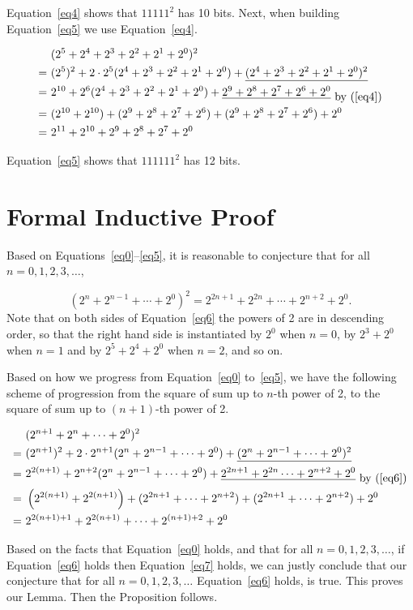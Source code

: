 \documentclass{article}
\begin{document}
Equation~\ref{eq4} shows that $11111^2$ has 10 bits. Next, when building Equation~\ref{eq5} we use Equation~\ref{eq4}.


\begin{eqnarray} \label{eq5}
    & (2^5+2^4+2^3+2^2+2^1+2^0)^2\nonumber\\
   =\ & (2^5)^2+2\cdot2^5(2^4+2^3+2^2+2^1+2^0)+\underline{(2^4+2^3+2^2+2^1+2^0)^2}\nonumber\\
   =\ & 2^{10}+2^6(2^4+2^3+2^2+2^1+2^0)+\underline{2^9+2^8+2^7+2^6+2^0}_{\mbox{ by (\ref{eq4})}}\nonumber\\
   =\ & (2^{10}+2^{10})+(2^9+2^8+2^7+2^6)+(2^9+2^8+2^7+2^6)+2^0\nonumber\\
   =\ & 2^{11}+2^{10}+2^9+2^8+2^7+2^0
\end{eqnarray}

Equation~\ref{eq5} shows that $111111^2$ has 12 bits.

\section{Formal Inductive Proof}

Based on Equations~\ref{eq0}--\ref{eq5}, it is reasonable to conjecture that for all $n=0,1,2,3,\ldots$,

\begin{equation} \label{eq6}
  (2^n+2^{n-1}+\cdots+2^0)^2=2^{2n+1}+2^{2n}+\cdots+2^{n+2}+2^0.
\end{equation}  
Note that on both sides of Equation~\ref{eq6} the powers of 2 are in descending order, so that the right hand side is instantiated by $2^0$ when $n=0$, by $2^3+2^0$ when $n=1$ and by $2^5+2^4+2^0$ when $n=2$, and so on.

Based on how we progress from Equation~\ref{eq0} to~\ref{eq5}, we have the following scheme of progression from the square of sum up to $n$-th power of 2, to the square of sum up to $(n+1)$-th power of 2.


\begin{eqnarray} \label{eq7} 
    & (2^{n+1}+2^n+\cdots+2^0)^2\nonumber\\
   =\ & (2^{n+1})^2+2\cdot2^{n+1}(2^n+2^{n-1}+\cdots+2^0)+\underline{(2^n+2^{n-1}+\cdots+2^0)^2}\nonumber\\
   =\ & 2^{2(n+1)}+2^{n+2}(2^n+2^{n-1}+\cdots+2^0)+\underline{2^{2n+1}+2^{2n}\cdots+2^{n+2}+2^0}_{\mbox{ by (\ref{eq6})}}\nonumber\\
   =\ & \left(2^{2(n+1)}+2^{2(n+1)}\right)+(2^{2n+1}+\cdots+2^{n+2})+(2^{2n+1}+\cdots+2^{n+2})+2^0\nonumber\\
   =\ & 2^{2(n+1)+1}+2^{2(n+1)}+\cdots+2^{(n+1)+2}+2^0
\end{eqnarray}

Based on the facts that Equation~\ref{eq0} holds, and that for all $n=0,1,2,3,\ldots$, if Equation~\ref{eq6} holds then Equation~\ref{eq7} holds, we can justly conclude that our conjecture that for all $n=0,1,2,3,\ldots$ Equation~\ref{eq6} holds, is true. This proves our Lemma. Then the Proposition follows. 
\end{document}
